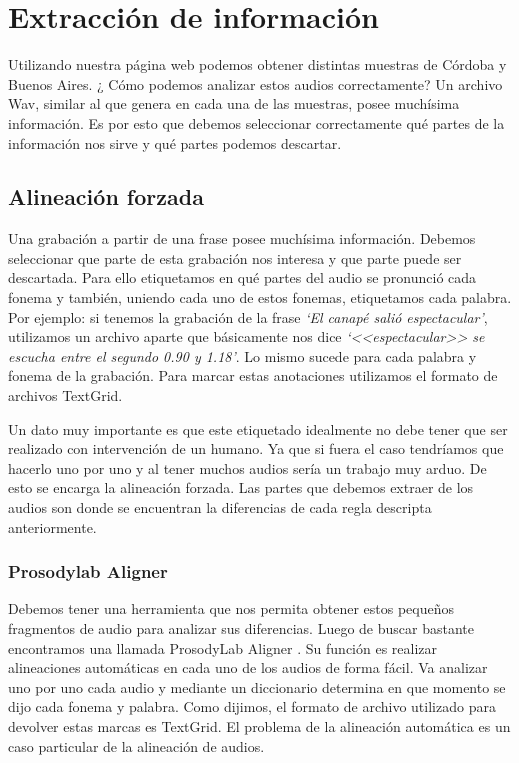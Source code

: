 \chapter{Extracción de información}

Utilizando nuestra página web podemos obtener distintas muestras de Córdoba y Buenos Aires. ¿ Cómo podemos analizar estos audios correctamente? Un archivo Wav, similar al que genera en cada una de las muestras, posee muchísima información. Es por esto que debemos seleccionar correctamente qué partes de la información nos sirve y qué partes podemos descartar.

\section{Alineación forzada}

Una grabación a partir de una frase posee muchísima información. Debemos seleccionar que parte de esta grabación nos interesa y que parte puede ser descartada. Para ello etiquetamos en qué partes del audio se pronunció cada fonema y también, uniendo cada uno de estos fonemas, etiquetamos cada palabra. Por ejemplo: si tenemos la grabación de la frase \textit{`El canapé salió espectacular’}, utilizamos un archivo aparte que básicamente nos dice \textit{`<<espectacular>> se escucha entre el segundo 0.90 y 1.18’}. Lo mismo sucede para cada palabra y fonema de la grabación. Para marcar estas anotaciones utilizamos el formato de archivos TextGrid.

Un dato muy importante es que este etiquetado idealmente no debe tener que ser realizado con intervención de un humano. Ya que si fuera el caso tendríamos que hacerlo uno por uno y al tener muchos audios sería un trabajo muy arduo. De esto se encarga la alineación forzada. Las partes que debemos extraer de los audios son donde se encuentran la diferencias de cada regla descripta anteriormente. 

\subsection{Prosodylab Aligner}


Debemos tener una herramienta que nos permita obtener estos pequeños fragmentos de audio para analizar sus diferencias. Luego de buscar bastante encontramos una llamada ProsodyLab Aligner \cite{prosodylab}. Su función es realizar alineaciones automáticas en cada uno de los audios de forma fácil. Va analizar uno por uno cada audio y mediante un diccionario determina en que momento se dijo cada fonema y palabra. Como dijimos, el formato de archivo utilizado para devolver estas marcas es TextGrid. El problema de la alineación automática es un caso particular de la alineación de audios.

